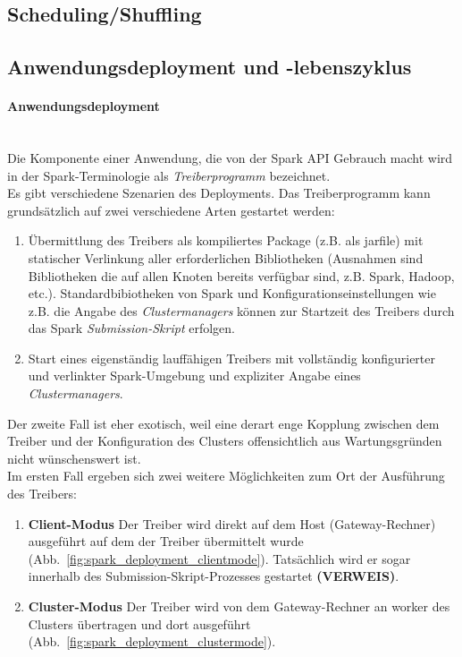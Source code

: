\subsection{Scheduling/Shuffling}

\subsection{Anwendungsdeployment und -lebenszyklus}

\paragraph{Anwendungsdeployment}\\

Die Komponente einer Anwendung, die von der Spark API Gebrauch macht wird in der Spark-Terminologie als \textit{Treiberprogramm} bezeichnet. \\

Es gibt verschiedene Szenarien des Deployments. Das Treiberprogramm kann grundsätzlich auf zwei verschiedene Arten gestartet werden:\\

\begin{enumerate}
	\item Übermittlung des Treibers als kompiliertes Package (z.B. als \gls{jarfile}) mit statischer Verlinkung aller erforderlichen Bibliotheken (Ausnahmen sind Bibliotheken die auf allen Knoten bereits verfügbar sind, z.B. Spark, Hadoop, etc.). Standardbibiotheken von Spark und Konfigurationseinstellungen wie z.B. die Angabe des \textit{Clustermanagers} können zur Startzeit des Treibers durch das Spark \textit{Submission-Skript} erfolgen.
	\item Start eines eigenständig lauffähigen Treibers mit vollständig konfigurierter und verlinkter Spark-Umgebung und expliziter Angabe eines \textit{Clustermanagers}.
\end{enumerate}

Der zweite Fall ist eher exotisch, weil eine derart enge Kopplung zwischen dem Treiber und der Konfiguration des Clusters offensichtlich aus Wartungsgründen nicht wünschenswert ist.\\

Im ersten Fall ergeben sich zwei weitere Möglichkeiten zum Ort der Ausführung des Treibers:\\

\begin{enumerate}
	\item \textbf{Client-Modus}	Der Treiber wird direkt auf dem Host (Gateway-Rechner) ausgeführt auf dem der Treiber übermittelt wurde (Abb.~\ref{fig:spark_deployment_clientmode}). Tatsächlich wird er sogar innerhalb des Submission-Skript-Prozesses gestartet \textbf{(VERWEIS)}.
	\item \textbf{Cluster-Modus}	Der Treiber wird von dem Gateway-Rechner an \gls{worker} des Clusters übertragen und dort ausgeführt (Abb.~\ref{fig:spark_deployment_clustermode}).
\end{enumerate}

